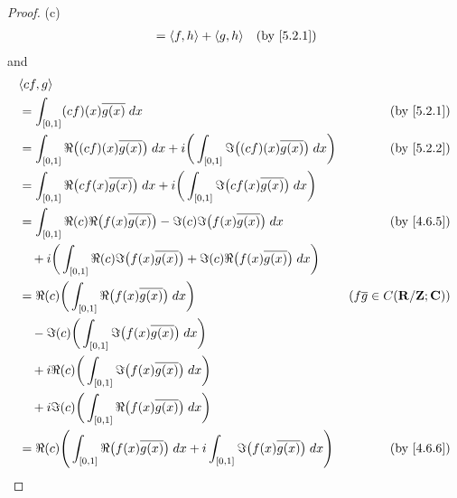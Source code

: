 \begin{proof}{(c)}
\begin{align*}
     & = \inner*{f, h} + \inner*{g, h}                                                                                                     & \text{(by \cref{5.2.1})}
  \end{align*}
  and
  \begin{align*}
     & \inner*{cf, g}                                                                                                                                                                      \\
     & = \int_{[0, 1]} (cf)(x) \overline{g(x)} \; dx                                                                                                & \text{(by \cref{5.2.1})}             \\
     & = \int_{[0, 1]} \Re\big((cf)(x) \overline{g(x)}\big) \; dx + i \bigg(\int_{[0, 1]} \Im\big((cf)(x) \overline{g(x)}\big) \; dx\bigg)          & \text{(by \cref{5.2.2})}             \\
     & = \int_{[0, 1]} \Re\big(cf(x) \overline{g(x)}\big) \; dx + i \bigg(\int_{[0, 1]} \Im\big(cf(x) \overline{g(x)}\big) \; dx\bigg)                                                     \\
     & = \int_{[0, 1]} \Re(c) \Re\big(f(x) \overline{g(x)}\big) - \Im(c) \Im\big(f(x) \overline{g(x)}\big) \; dx                                    & \text{(by \cref{4.6.5})}             \\
     & \quad + i \bigg(\int_{[0, 1]} \Re(c) \Im\big(f(x) \overline{g(x)}\big) + \Im(c) \Re\big(f(x) \overline{g(x)}\big) \; dx\bigg)                                                       \\
     & = \Re(c) \bigg(\int_{[0, 1]} \Re\big(f(x) \overline{g(x)}\big) \; dx\bigg)                                                                   & (f \overline{g} \in C(\R / \Z ; \C)) \\
     & \quad - \Im(c) \bigg(\int_{[0, 1]} \Im\big(f(x) \overline{g(x)}\big) \; dx\bigg)                                                                                                    \\
     & \quad + i \Re(c) \bigg(\int_{[0, 1]} \Im\big(f(x) \overline{g(x)}\big) \; dx\bigg)                                                                                                  \\
     & \quad + i \Im(c) \bigg(\int_{[0, 1]} \Re\big(f(x) \overline{g(x)}\big) \; dx\bigg)                                                                                                  \\
     & = \Re(c) \Bigg(\int_{[0, 1]} \Re\big(f(x) \overline{g(x)}\big) \; dx + i \int_{[0, 1]} \Im\big(f(x) \overline{g(x)}\big) \; dx\Bigg)         & \text{(by \cref{4.6.6})}             \\

\end{align*}
\end{proof}
